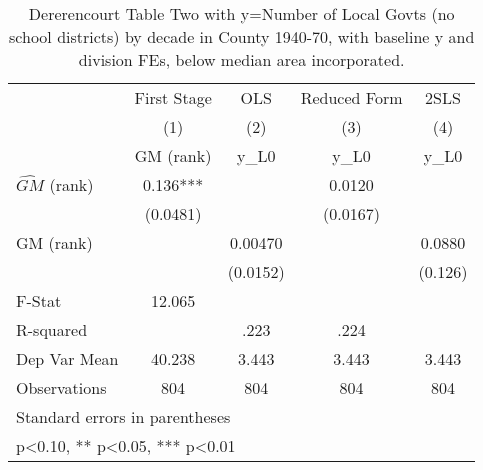 \begin{table}[htbp]\centering
\def\sym#1{\ifmmode^{#1}\else\(^{#1}\)\fi}
\caption{Dererencourt Table Two with y=Number of Local Govts (no school districts) by decade in County 1940-70, with baseline y and division FEs, below median area incorporated.}
\begin{tabular}{l*{4}{c}}
\toprule
                    & First Stage   &         OLS   &Reduced Form   &        2SLS   \\
                    &\multicolumn{1}{c}{(1)}&\multicolumn{1}{c}{(2)}&\multicolumn{1}{c}{(3)}&\multicolumn{1}{c}{(4)}\\
                    &\multicolumn{1}{c}{GM  (rank)}&\multicolumn{1}{c}{y\_L0}&\multicolumn{1}{c}{y\_L0}&\multicolumn{1}{c}{y\_L0}\\
\midrule
$\hat{GM}$ (rank)   &       0.136***&               &      0.0120   &               \\
                    &    (0.0481)   &               &    (0.0167)   &               \\
\addlinespace
GM  (rank)          &               &     0.00470   &               &      0.0880   \\
                    &               &    (0.0152)   &               &     (0.126)   \\
\midrule
F-Stat              &      12.065   &               &               &               \\
R-squared           &               &        .223   &        .224   &               \\
Dep Var Mean        &      40.238   &       3.443   &       3.443   &       3.443   \\
Observations        &         804   &         804   &         804   &         804   \\
\bottomrule
\multicolumn{5}{l}{\footnotesize Standard errors in parentheses}\\
\multicolumn{5}{l}{\footnotesize * p<0.10, ** p<0.05, *** p<0.01}\\
\end{tabular}
\end{table}
